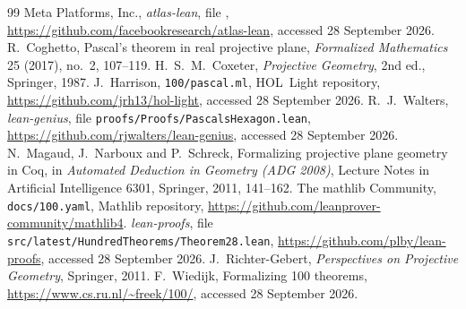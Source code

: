 \documentclass[11pt]{article}
\theoremstyle{remark}
\begin{document}
\begin{thebibliography}{99}
 Meta Platforms, Inc., \emph{atlas-lean}, file
,
\url{https://github.com/facebookresearch/atlas-lean}, accessed 28 September 2026.
 R.~Coghetto, Pascal's theorem in real projective plane, \emph{Formalized
Mathematics} 25 (2017), no.~2, 107--119.
 H.~S.~M.~Coxeter, \emph{Projective Geometry}, 2nd ed., Springer, 1987.
 J.~Harrison, \texttt{100/pascal.ml}, HOL~Light repository,
\url{https://github.com/jrh13/hol-light}, accessed 28 September 2026.
 R.~J.~Walters, \emph{lean-genius}, file \texttt{proofs/Proofs/PascalsHexagon.lean},
\url{https://github.com/rjwalters/lean-genius}, accessed 28 September 2026.
 N.~Magaud, J.~Narboux and P.~Schreck, Formalizing projective plane geometry
in Coq, in \emph{Automated Deduction in Geometry (ADG 2008)}, Lecture Notes in Artificial
Intelligence 6301, Springer, 2011, 141--162.
 The mathlib Community, \texttt{docs/100.yaml}, Mathlib repository,
\url{https://github.com/leanprover-community/mathlib4}.
 \emph{lean-proofs}, file \texttt{src/latest/HundredTheorems/Theorem28.lean},
\url{https://github.com/plby/lean-proofs}, accessed 28 September 2026.
 J.~Richter-Gebert, \emph{Perspectives on Projective Geometry},
Springer, 2011.
 F.~Wiedijk, Formalizing 100 theorems, \url{https://www.cs.ru.nl/~freek/100/},
accessed 28 September 2026.
\end{thebibliography}
\end{document}
